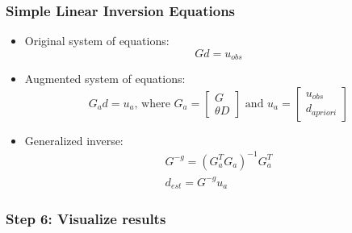 \documentclass{beamer}
\begin{document}
\begin{frame}
  \frametitle{Simple Linear Inversion Equations}
  \summary{}

  \begin{itemize}
  \item Original system of equations:
    \begin{equation}
      G d = u_\mathit{obs}
    \end{equation}
  \item Augmented system of equations:
    \begin{equation}
      G_a d = u_a \text{, where } 
      G_a = \left[ \begin{array}{c} G \\ \theta D \end{array} \right]
      \text{ and }
      u_a = \left[ \begin{array}{c} u_{obs} \\ d_\mathit{apriori} \end{array} \right]
    \end{equation}
  \item Generalized inverse:
    \begin{gather}
      G^{-g} = \left( G_a^T G_a \right)^{-1} G_a^T \\
      d_{est} = G^{-g} u_a
    \end{gather}
  \end{itemize}
  
\end{frame}


\begin{frame}
  \frametitle{Step 6: Visualize results}

  
\end{frame}

\end{document}
